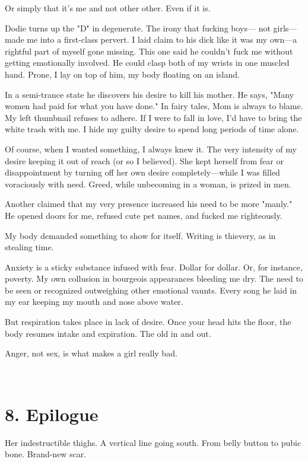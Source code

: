 \documentclass[
]{memoir}
\begin{document}
Or simply that it's me and not other other. Even if it is.

Dodie turns up the "D" in degenerate. The irony that fucking boys--- not
girls---made me into a first-class pervert. I laid claim to his dick
like it was my own---a rightful part of myself gone missing. This one
said he couldn't fuck me without getting emotionally involved. He could
clasp both of my wrists in one muscled hand. Prone, I lay on top of him,
my body floating on an island.

In a semi-trance state he discovers his desire to kill his mother. He
says, "Many women had paid for what you have done." In fairy tales, Mom
is always to blame. My left thumbnail refuses to adhere. If I were to
fall in love, I'd have to bring the white trash with me. I hide my
guilty desire to spend long periods of time alone.

Of course, when I wanted something, I always knew it. The very intensity
of my desire keeping it out of reach (or so I believed). She kept
herself from fear or disappointment by turning off her own desire
completely---while I was filled voraciously with need. Greed, while
unbecoming in a woman, is prized in men.

Another claimed that my very presence increased his need to be more
"manly." He opened doors for me, refused cute pet names, and fucked me
righteously.

My body demanded something to show for itself. Writing is thievery, as
in stealing time.

Anxiety is a sticky substance infused with fear. Dollar for dollar. Or,
for instance, poverty. My own collusion in bourgeois appearances
bleeding me dry. The need to be seen or recognized outweighing other
emotional vaunts. Every song he laid in my ear keeping my mouth and nose
above water.

But respiration takes place in lack of desire. Once your head hits the
floor, the body resumes intake and expiration. The old in and out.

Anger, not sex, is what makes a girl really bad.

~

\hypertarget{epilogue}{%
\section*{8. Epilogue}\label{epilogue}}

Her indestructible thighs. A vertical line going south. From belly
button to pubic bone. Brand-new scar.
\end{document}
